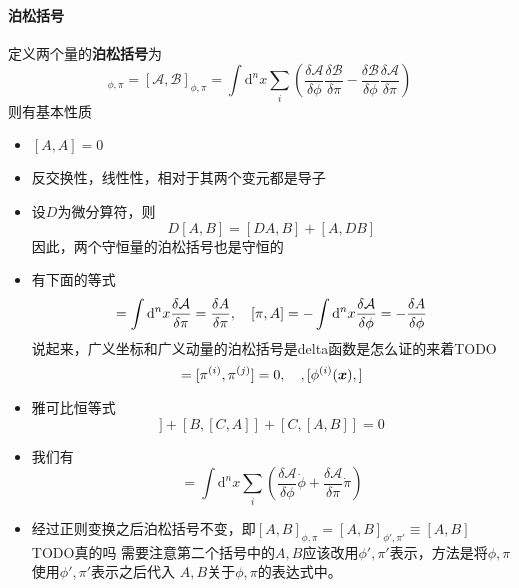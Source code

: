 \documentclass[UTF8, a4paper]{ctexart}
\begin{document}
\paragraph{泊松括号} 定义两个量的\textbf{泊松括号}为
\begin{equation}
    [A, B]_{\phi, \pi} = [\mathcal{A}, \mathcal{B}]_{\phi, \pi} = \int \mathrm{d}^n x \sum_i \left(
    \frac{\delta \mathcal{A}}{\delta \phi} \frac{\delta \mathcal{B}}{\delta \pi} - \frac{\delta \mathcal{B}}{\delta \phi} \frac{\delta \mathcal{A}}{\delta \pi}
    \right) 
    \label{eq:poison-bracket-def}
\end{equation}
则有基本性质
\begin{itemize}
    \item $[A, A]=0$
    \item 反交换性，线性性，相对于其两个变元都是导子
    \item  设$D$为微分算符，则
        \begin{equation}
            D[A, B] = [DA, B] + [A, DB]
            \label{eq:derivative-of-poison-brackets}
        \end{equation}
        因此，两个守恒量的泊松括号也是守恒的
    \item 有下面的等式
    \begin{equation}
        [\phi, A] = \int \mathrm{d}^n x \frac{\delta \mathcal{A}}{\delta \pi} = \fdv{A}{\pi}, \quad [\pi, A] = - \int \mathrm{d}^n x \frac{\delta \mathcal{A}}{\delta \phi} = -\fdv{A}{\phi}
    \end{equation}
    说起来，广义坐标和广义动量的泊松括号是delta函数是怎么证的来着TODO
    \begin{equation}
        [\phi^{(i)}, \phi^{(j)}] = [\pi^{(i)}, \pi^{(j)}] = 0, \quad, [\phi^{(i)}(\vb*{x}), ] 
    \end{equation}
    \item 雅可比恒等式
    \begin{equation}
        [A, [B, C]] + [B, [C, A]] + [C, [A, B]] = 0
        \label{eq:jacobi-identity}
    \end{equation}
    \item 我们有
    \begin{equation}
        [A, H] = \int \mathrm{d}^n x \sum_i \left(
        \frac{\delta \mathcal{A}}{\delta \phi} \dot{\phi} + \frac{\delta \mathcal{A}}{\delta \pi} \dot{\pi}     
        \right)
    \end{equation}
    \item 经过正则变换之后泊松括号不变，即$[A, B]_{\phi, \pi} = [A, B]_{\phi', \pi'} \equiv [A, B]$ TODO真的吗
    需要注意第二个括号中的$A,B$应该改用$\phi', \pi'$表示，方法是将$\phi, \pi$使用$\phi', \pi'$表示之后代入
    $A, B$关于$\phi, \pi$的表达式中。
\end{itemize}
\end{document}
